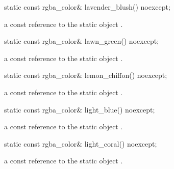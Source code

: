 \begin{itemdecl}
    static const rgba_color& lavender_blush() noexcept;
\end{itemdecl}
\begin{itemdescr}
    \pnum
    \returns
    a const reference to the static  object .
\end{itemdescr}

\begin{itemdecl}
    static const rgba_color& lawn_green() noexcept;
\end{itemdecl}
\begin{itemdescr}
    \pnum
    \returns
    a const reference to the static  object .
\end{itemdescr}

\begin{itemdecl}
    static const rgba_color& lemon_chiffon() noexcept;
\end{itemdecl}
\begin{itemdescr}
    \pnum
    \returns
    a const reference to the static  object .
\end{itemdescr}

\begin{itemdecl}
    static const rgba_color& light_blue() noexcept;
\end{itemdecl}
\begin{itemdescr}
    \pnum
    \returns
    a const reference to the static  object .
\end{itemdescr}

\begin{itemdecl}
    static const rgba_color& light_coral() noexcept;
\end{itemdecl}
\begin{itemdescr}
    \pnum
    \returns
    a const reference to the static  object .
\end{itemdescr}

